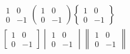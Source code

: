 \documentclass{book}
\begin{document}
\begin{gather*}
\begin{matrix} 1 & 0 \\ 0 &-1\end{matrix}
\begin{pmatrix}1 & 0 \\ 0 &-1\end{pmatrix}
\begin{Bmatrix}1 & 0 \\ 0 &-1\end{Bmatrix}\\
\begin{bmatrix}1 & 0 \\ 0 &-1\end{bmatrix}
\begin{vmatrix}1 & 0 \\ 0 &-1\end{vmatrix}
\begin{Vmatrix}1 & 0 \\ 0 &-1\end{Vmatrix}
\end{gather*}
\end{document}
